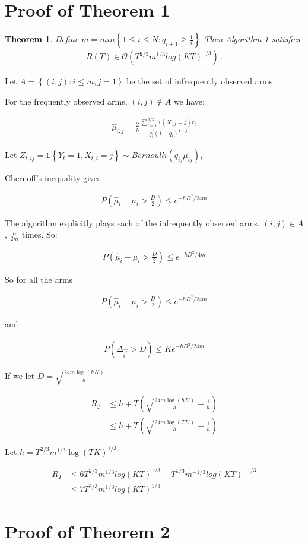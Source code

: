 \documentclass{article}
\newcommand{\set}[1]{\left\{#1\right\}}
\newcommand{\ind}[1]{\mathds{1}\!\!\set{#1}}
\newcommand{\eqn}[1]{\begin{align}#1\end{align}}
\newcommand{\eq}[1]{\begin{align*}#1\end{align*}}
\newcommand{\bigo}[1]{\mathcal{O}\left( #1 \right)}
\theoremstyle{plain}
\newtheorem{theorem}{Theorem}
\theoremstyle{definition}
\begin{document}
\def\ci{\perp\!\!\!\perp}

\section{Proof of Theorem 1}
\begin{theorem}\label{thm:known_q_regret}
Define $m =   min\set{1 \leq i \leq N:q_{i+1} \geq \frac{1}{i}}$
Then Algorithm 1 satisfies
\eq{
R(T) \in \bigo{T^{2/3}m^{1/3}log(KT)^{1/3}}\,.
}
\end{theorem}

Let $A = \set{(i,j) : i \leq m, j = 1}$ be the set of infrequently observed arms

For the frequently observed arms, $(i,j) \notin A$ we have:

\eqn {
\hat{\mu}_{i,j} = \frac{2}{h}\frac{\sum_{t=1}^{h/2}\ind{X_{i,t}=j}r_t}{q_i^j(1-q_i)^{1-j}}
}

Let $Z_{t,ij} = \ind{Y_t=1,X_{t,i}=j} \sim Bernoulli(q_{ij}\mu_{ij})$, 

Chernoff's inequality gives

\eqn{
P(\hat{\mu}_i - \mu_{i} > \frac{D}{2}) \leq e^{-hD^2/24m}
}

The algorithm explicitly plays each of the infrequently observed arms, $(i,j) \in A$, $\frac{h}{2m}$ times. So:

\eqn{
P(\hat{\mu}_i - \mu_{i} > \frac{D}{2}) \leq e^{-hD^2/4m}
}

So for all the arms 

\eqn{
P(\hat{\mu}_i - \mu_{i} > \frac{D}{2}) \leq e^{-hD^2/24m}
}

and 



\eqn{
\label{eqn:unbalancedHoeffdings}
P(\Delta_{\hat{i^*}} > D) \leq Ke^{-hD^2/24m}
}

If we let $D = \sqrt{\frac{24m\log(hK)}{h}}$

\eqn{
R_T &  \leq h + T\left(\sqrt{\frac{24m\log(hK)}{h}} + \frac{1}{h}\right) \\
& \leq h + T\left(\sqrt{\frac{24m\log(TK)}{h}} + \frac{1}{h}\right) 
}

Let $h = T^{2/3}m^{1/3}\log(TK)^{1/3}$


\eqn {
R_T & \leq 6T^{2/3}m^{1/3}log(KT)^{1/3} + T^{1/3}m^{-1/3}log(KT)^{-1/3}\\ 
& \leq 7T^{2/3}m^{1/3}log(KT)^{1/3}
}
 
\section{Proof of Theorem 2}
\end{document}
